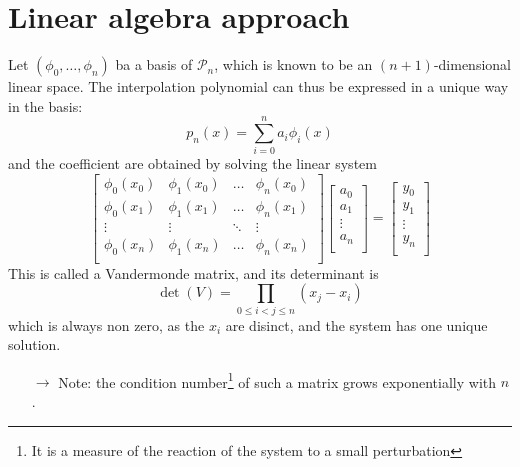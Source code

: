 \documentclass[12pt, openany]{report}
\theoremstyle{definition}
\begin{document}
\section{Linear algebra approach}
Let \((\phi_0,\dots,\phi_n)\) ba a basis of \(\mathcal{P}_n\), which is known to be an \((n+1)\)-dimensional linear space. The interpolation polynomial can thus be expressed in a unique way in the basis:
\begin{equation}
    p_n(x) = \sum_{i=0}^n a_i\phi_i(x)
\end{equation}
and the coefficient are obtained by solving the linear system
\begin{equation}
    \begin{bmatrix}
        \phi_0(x_0) & \phi_1(x_0) & \dots & \phi_n(x_0)\\
        \phi_0(x_1) & \phi_1(x_1) & \dots & \phi_n(x_1)\\
        \vdots  & \vdots & \ddots & \vdots\\
        \phi_0(x_n) & \phi_1(x_n) & \dots & \phi_n(x_n)\\
    \end{bmatrix}\begin{bmatrix}
        a_0\\ a_1\\ \vdots \\a_n\\
    \end{bmatrix} = \begin{bmatrix}
        y_0 \\y_1\\\vdots \\ y_n\\
    \end{bmatrix}
\end{equation}
This is called a Vandermonde matrix, and its determinant is 
\begin{equation}
    \det(V) = \prod_{0\le i< j\le n}(x_j-x_i)
\end{equation}
which is always non zero, as the \(x_i\) are disinct, and the system has one unique solution. 
\begin{itemize}
    \item [\(\rightarrow\)] Note: the condition number\footnote{It is a measure of the reaction of the system to a small perturbation} of such a matrix grows exponentially with \(n\). 
\end{itemize}
\end{document}
